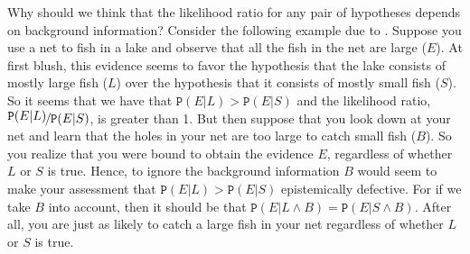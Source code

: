 \documentclass{article}
\newcommand{\pr}[1]{\mbox{$\mathtt{P}(#1)$}}
\begin{document}
Why should we think that the likelihood ratio for any pair of hypotheses depends on background information? Consider the following example due to \citet{Eddington1939}. Suppose you use a net to fish in a lake and observe that all the fish in the net are large ($E$). At first blush, this evidence seems to favor the hypothesis that the lake consists of mostly large fish ($L$) over the hypothesis that it consists of mostly small fish ($S$). So it seems that we have that $\pr{E\vert L} > \pr{E\vert S}$ and the likelihood ratio, $\nicefrac{\pr{E\vert L }}{\pr{E\vert S}}$, is greater than 1. But then suppose that you look down at your net and learn that the holes in your net are too large to catch small fish ($B$). So you realize that you were bound to obtain the evidence $E$, regardless of whether $L$ or $S$ is true. Hence, to ignore the background information $B$ would seem to make your assessment that $\pr{E\vert L} > \pr{E\vert S}$ epistemically defective. For if we take $B$ into account, then it should be that $\pr{E\vert L \wedge B} = \pr{E\vert S\wedge B}$. After all, you are just as likely to catch a large fish in your net regardless of whether $L$ or $S$ is true.
\end{document}
